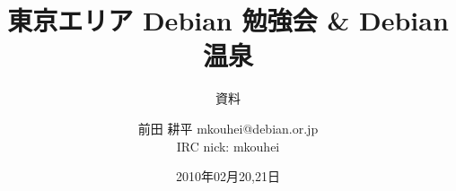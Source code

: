 




\documentclass[cjk,dvipdfmx,12pt]{beamer}
\usepackage{monthlypresentation}


\title{東京エリア Debian 勉強会 \& Debian 温泉}
\subtitle{資料}
\author{前田 耕平 mkouhei@debian.or.jp\\IRC nick: mkouhei}
\date{2010年02月20,21日}



